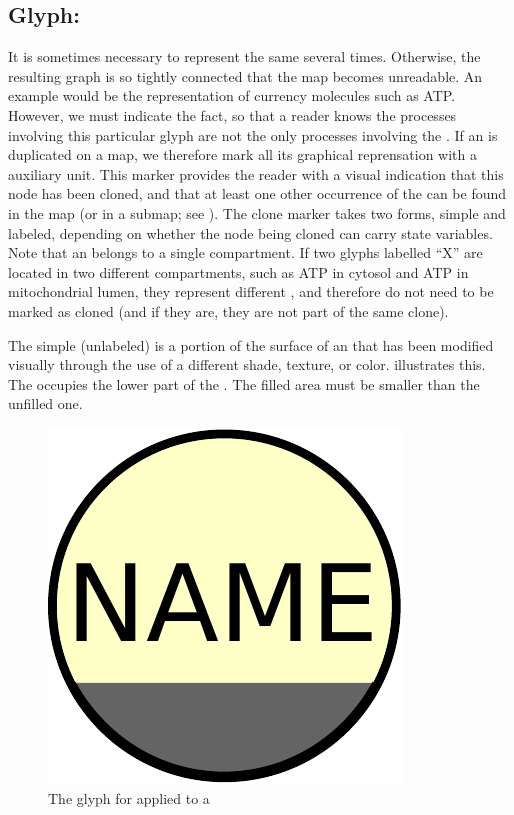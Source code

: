 
\subsection{Glyph: }
\label{sec:cloneMarker}

It is sometimes necessary to represent the same  several times. Otherwise, the resulting graph is so tightly connected that the map becomes unreadable. An example would be the representation of currency molecules such as ATP. However, we must indicate the fact, so that a reader knows the processes involving this particular glyph are not the only processes involving the . If an  is duplicated on a map, we therefore mark all its graphical reprensation with a  auxiliary unit.  This marker provides the reader with a visual indication that this node has been cloned, and that at least one other occurrence of the  can be found in the map (or in a submap; see ).  The clone marker takes two forms, simple and labeled, depending on whether the node being cloned can carry state variables. Note that an  belongs to a single compartment. If two glyphs labelled ``X'' are located in two different compartments, such as ATP in cytosol and ATP in mitochondrial lumen, they represent different , and therefore do not need to be marked as cloned (and if they are, they are not part of the same clone).

The simple (unlabeled)  is a portion of the surface of an  that has been modified visually through the use of a different shade, texture, or color.   illustrates this. The  occupies the lower part of the . The filled area must be smaller than the unfilled one.

\begin{figure}[H]
  \centering
  \includegraphics[scale = 0.3]{images/simpleCloneMarker}
  \caption{The \PD glyph for  applied to a }
  \label{fig:simpleCloneMarker}
\end{figure}

